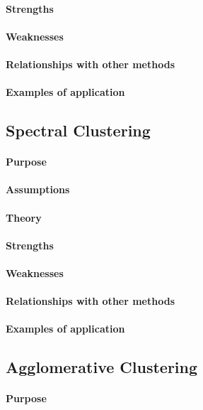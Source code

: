 \paragraph{Strengths}
\paragraph{Weaknesses}
\paragraph{Relationships with other methods}
\paragraph{Examples of application}


\subsection{Spectral Clustering}
\paragraph{Purpose}
\paragraph{Assumptions}
\paragraph{Theory}
\paragraph{Strengths}
\paragraph{Weaknesses}
\paragraph{Relationships with other methods}
\paragraph{Examples of application}


\subsection{Agglomerative Clustering}
\paragraph{Purpose}

